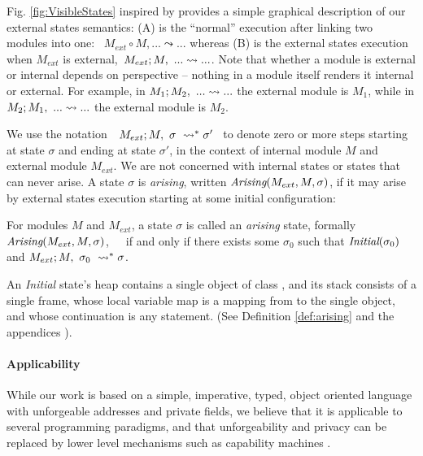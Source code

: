 Fig. \ref{fig:VisibleStates} inspired by  provides a simple graphical description of 
our external states semantics: (A) is the ``normal'' execution after 
linking two modules into one: \ $M_{ext} \circ M, ... \leadsto ...$ whereas (B) is the
 external states execution when $M_{ext}$ is external,\   $M_{ext} ; M,\ ... \leadsto ...$.
Note that whether a module is external or internal depends on %
perspective -- nothing in a module itself renders it internal or external. For example, in
 $M_1 ; M_2,\ ... \leadsto ...$ the external module is $M_1$,
  while in  $M_2 ; M_1,\ ... \leadsto ...$  the external module is $M_2$.

We  use the notation\ \  $M_{ext} ; M,\ \sigma\ \leadsto^* \sigma'$ \ 
to denote zero or more  steps starting at state $\sigma$ and ending at state $\sigma'$, in the context of internal module 
$M$ and external module $M_{ext}$.
We are {not} concerned with internal states or states that can never arise.
{A state $\sigma$ is \emph{arising},}  written $\textit{Arising}(M_{ext}, M, \sigma)$, {if it  may arise by external states} execution
starting at some initial configuration:



\begin{definition}
\label{def:arising}
For   modules $M$ and  $M_{ext}$, a %
 state $\sigma$ is 
called an \emph{arising} state, formally \ \ \ $\textit{Arising}(M_{ext}, M, \sigma)$,\ \ \ 
if and only if there exists some $\sigma_0$ such that $\textit{Initial}(\sigma_0)$ and
$M_{ext} ; M,\ \sigma_0\ \leadsto^* \sigma$.
\end{definition}

An \emph{Initial} state's heap
contains a single object of class , and
its  stack   consists of a single frame, whose local variable map is a
mapping from \prg{this} to the single object, and whose continuation is  any statement.
(See Definition %
\ref{def:arising} and the 
{appendices %
\cite{necessityFull}).}


\paragraph{Applicability} 
{While our work is based on 
  a simple, imperative, typed, object oriented}
language with unforgeable addresses and private fields, we believe
 that %
 it is applicable to several programming paradigms, and 
 that   unforgeability and privacy
 can be replaced 
 by lower level mechanisms such as capability machines \cite{vanproving,davis2019cheriabi}.

